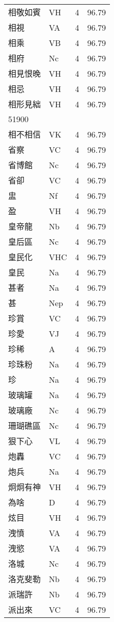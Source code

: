 \documentclass[twocolumn]{book}
\begin{document}
\begin{supertabular}{llrr}
相敬如賓 & VH & 4 &  96.79\\
相視 & VA & 4 &  96.79\\
相乘 & VB & 4 &  96.79\\
相府 & Nc & 4 &  96.79\\
相見恨晚 & VH & 4 &  96.79\\
相忌 & VH & 4 &  96.79\\
相形見絀 & VH & 4 &  96.79\\
51900\\
相不相信 & VK & 4 &  96.79\\
省察 & VC & 4 &  96.79\\
省博館 & Nc & 4 &  96.79\\
省卻 & VC & 4 &  96.79\\
盅 & Nf & 4 &  96.79\\
盈 & VH & 4 &  96.79\\
皇帝龍 & Nb & 4 &  96.79\\
皇后區 & Nc & 4 &  96.79\\
皇民化 & VHC & 4 &  96.79\\
皇民 & Na & 4 &  96.79\\
甚者 & Na & 4 &  96.79\\
甚 & Nep & 4 &  96.79\\
珍賞 & VC & 4 &  96.79\\
珍愛 & VJ & 4 &  96.79\\
珍稀 & A & 4 &  96.79\\
珍珠粉 & Na & 4 &  96.79\\
珍 & Na & 4 &  96.79\\
玻璃罐 & Na & 4 &  96.79\\
玻璃廠 & Nc & 4 &  96.79\\
珊瑚礁區 & Nc & 4 &  96.79\\
狠下心 & VL & 4 &  96.79\\
炮轟 & VC & 4 &  96.79\\
炮兵 & Na & 4 &  96.79\\
炯炯有神 & VH & 4 &  96.79\\
為啥 & D & 4 &  96.79\\
炫目 & VH & 4 &  96.79\\
洩憤 & VA & 4 &  96.79\\
洩慾 & VA & 4 &  96.79\\
洛城 & Nc & 4 &  96.79\\
洛克斐勒 & Nb & 4 &  96.79\\
派瑞許 & Nb & 4 &  96.79\\
派出來 & VC & 4 &  96.79\\

\end{supertabular}
\end{document}
